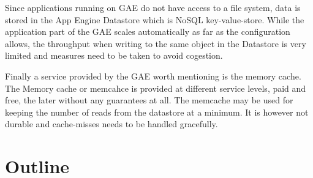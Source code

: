 Since applications running on GAE do not have access to a file system, data is stored in the App Engine Datastore which is NoSQL key-value-store. While the application part of the GAE scales automatically as far as the configuration allows, the throughput when writing to the same object in the Datastore is very limited and measures need to be taken to avoid cogestion. 

Finally a service provided by the GAE worth mentioning is the memory cache. The Memory cache or memcahce is provided at different service levels, paid and free, the later without any guarantees at all. The memcache may be used for keeping the number of reads from the datastore at a minimum. It is however not durable and cache-misses needs to be handled gracefully.

\section{Outline}
